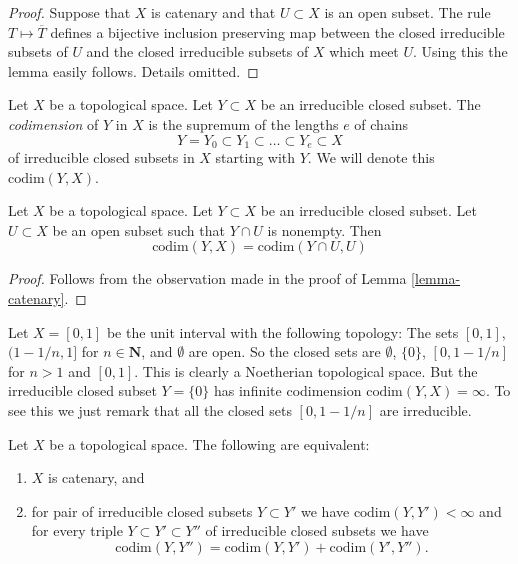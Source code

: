 \begin{proof}
Suppose that $X$ is catenary and that $U \subset X$ is an open
subset. The rule $T \mapsto \overline{T}$ defines a bijective
inclusion preserving map between the closed irreducible subsets
of $U$ and the closed irreducible subsets of $X$ which meet $U$.
Using this the lemma easily follows. Details omitted.
\end{proof}

\begin{definition}
\label{definition-codimension}
Let $X$ be a topological space.
Let $Y \subset X$ be an irreducible closed subset.
The {\it codimension} of $Y$ in $X$ is the supremum of
the lengths $e$ of chains
$$
Y = Y_0 \subset Y_1 \subset \ldots \subset Y_e \subset X
$$
of irreducible closed subsets in $X$ starting with $Y$.
We will denote this $\text{codim}(Y, X)$.
\end{definition}

\begin{lemma}
\label{lemma-codimension-at-generic-point}
Let $X$ be a topological space.
Let $Y \subset X$ be an irreducible closed subset.
Let $U \subset X$ be an open subset such that $Y \cap U$ is nonempty.
Then
$$
\text{codim}(Y, X) = \text{codim}(Y \cap U, U)
$$
\end{lemma}

\begin{proof}
Follows from the observation made in the proof of
Lemma \ref{lemma-catenary}.
\end{proof}

\begin{example}
\label{example-Noetherian-infinite-codimension}
Let $X = [0, 1]$ be the unit interval with the following
topology: The sets $[0, 1]$, $(1 - 1/n, 1]$ for $n \in \mathbf{N}$, and
$\emptyset$ are open. So the closed sets are
$\emptyset$, $\{0\}$, $[0, 1 - 1/n]$ for $n > 1$ and $[0, 1]$.
This is clearly a Noetherian topological space.
But the irreducible closed subset $Y = \{0\}$ has infinite
codimension $\text{codim}(Y, X) = \infty$.
To see this we just remark that all the closed sets
$[0, 1 - 1/n]$ are irreducible.
\end{example}

\begin{lemma}
\label{lemma-catenary-in-codimension}
Let $X$ be a topological space. The following are equivalent:
\begin{enumerate}
\item $X$ is catenary, and
\item for pair of irreducible closed subsets $Y \subset Y'$ we have
$\text{codim}(Y, Y') < \infty$ and for every triple
$Y \subset Y' \subset Y''$ of irreducible closed subsets we have
$$
\text{codim}(Y, Y'') = \text{codim}(Y, Y') + \text{codim}(Y', Y'').
$$
\end{enumerate}
\end{lemma}

